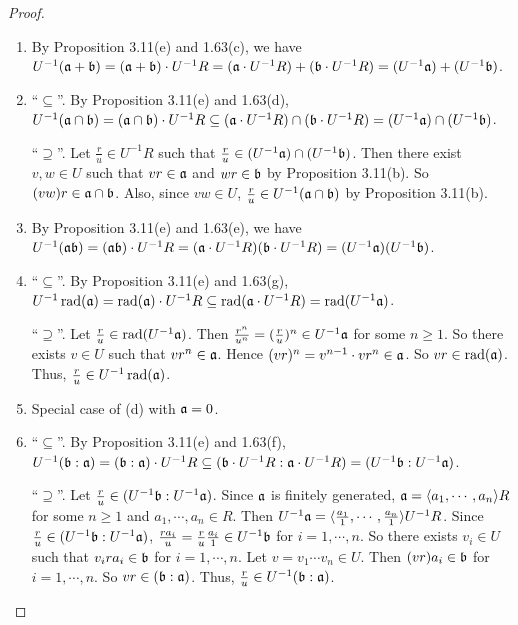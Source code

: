 \begin{proof}
    \begin{enumerate}
        \item By Proposition 3.11(e) and 1.63(c), we have $U^{-1}(\mathfrak{a}+\mathfrak{b}) = (\mathfrak{a}+\mathfrak{b}) \cdot U^{-1}R = (\mathfrak{a} \cdot U^{-1}R) + (\mathfrak{b} \cdot U^{-1}R) = (U^{-1}\mathfrak{a}) + (U^{-1}\mathfrak{b})$.
        \item ``$\subseteq$''. By Proposition 3.11(e) and 1.63(d), $U^{-1}(\mathfrak{a} \cap \mathfrak{b}) = (\mathfrak{a} \cap \mathfrak{b}) \cdot U^{-1}R \subseteq (\mathfrak{a} \cdot U^{-1}R) \cap (\mathfrak{b} \cdot U^{-1}R) = (U^{-1}\mathfrak{a}) \cap (U^{-1}\mathfrak{b})$. \par 
            ``$\supseteq$''. Let $\frac{r}{u} \in U^{-1}R$ such that $\frac{r}{u} \in (U^{-1}\mathfrak{a}) \cap (U^{-1}\mathfrak{b})$. Then there exist $v,w \in U$ such that $vr \in \mathfrak{a}$ and $wr \in \mathfrak{b}$ by Proposition 3.11(b). So $(vw)r \in \mathfrak{a} \cap \mathfrak{b}$. Also, since $vw \in U$, $\frac{r}{u} \in U^{-1}(\mathfrak{a} \cap \mathfrak{b})$ by Proposition 3.11(b). 
        \item By Proposition 3.11(e) and 1.63(e), we have $U^{-1}(\mathfrak{a}\mathfrak{b}) = (\mathfrak{a}\mathfrak{b}) \cdot U^{-1}R = (\mathfrak{a} \cdot U^{-1}R)(\mathfrak{b} \cdot U^{-1}R) = (U^{-1}\mathfrak{a})(U^{-1}\mathfrak{b})$.
        \item ``$\subseteq$''. By Proposition 3.11(e) and 1.63(g), $U^{-1} \operatorname{rad}(\mathfrak{a}) = \operatorname{rad}(\mathfrak{a}) \cdot U^{-1}R \subseteq \operatorname{rad}(\mathfrak{a} \cdot U^{-1}R) = \operatorname{rad}(U^{-1}\mathfrak{a})$. \par 
            ``$\supseteq$''. Let $\frac{r}{u} \in \operatorname{rad}(U^{-1}\mathfrak{a})$. Then $\frac{r^{n}}{u^{n}} = (\frac{r}{u})^{n} \in U^{-1}\mathfrak{a}$ for some $n \geq 1$. So there exists $v \in U$ such that $vr^{n} \in \mathfrak{a}$. Hence $(vr)^{n} = v^{n-1} \cdot vr^{n} \in \mathfrak{a}$. So $vr \in \operatorname{rad}(\mathfrak{a})$. Thus, $\frac{r}{u} \in U^{-1} \operatorname{rad}(\mathfrak{a})$.
        \item Special case of (d) with $\mathfrak{a} = 0$. 
        \item ``$\subseteq$''. By Proposition 3.11(e) and 1.63(f), $U^{-1}(\mathfrak{b}:\mathfrak{a}) = (\mathfrak{b}:\mathfrak{a}) \cdot U^{-1}R \subseteq (\mathfrak{b} \cdot U^{-1}R: \mathfrak{a} \cdot U^{-1}R) = (U^{-1}\mathfrak{b}:U^{-1}\mathfrak{a})$. \par 
            ``$\supseteq$''. Let $\frac{r}{u} \in (U^{-1}\mathfrak{b}:U^{-1}\mathfrak{a})$. Since $\mathfrak{a}$ is finitely generated, $\mathfrak{a} = \langle a_{1},\cdots,a_{n} \rangle R$ for some $n \geq 1$ and $a_{1},\cdots,a_{n} \in R$. Then $U^{-1}\mathfrak{a} = \langle \frac{a_{1}}{1},\cdots,\frac{a_{n}}{1} \rangle U^{-1}R$. Since $\frac{r}{u} \in (U^{-1}\mathfrak{b}:U^{-1}\mathfrak{a})$, $\frac{ra_{i}}{u} = \frac{r}{u} \frac{a_{i}}{1} \in U^{-1}\mathfrak{b}$ for $i = 1,\cdots,n$. So there exists $v_{i} \in U$ such that $v_{i} ra_{i} \in \mathfrak{b}$ for $i = 1,\cdots,n$. Let $v = v_{1} \cdots v_{n} \in U$. Then $(vr)a_{i} \in \mathfrak{b}$ for $i = 1,\cdots,n$. So $vr \in (\mathfrak{b}:\mathfrak{a})$. Thus, $\frac{r}{u} \in U^{-1}(\mathfrak{b}:\mathfrak{a})$.
    \end{enumerate}
\end{proof}


